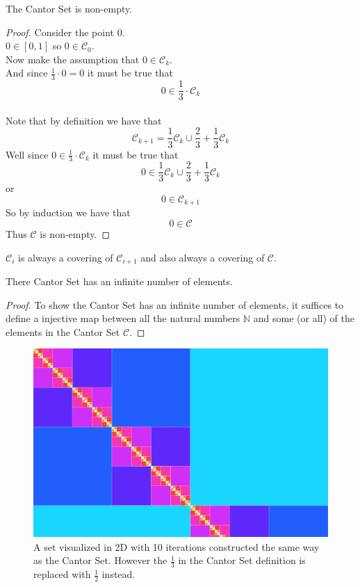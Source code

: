 \documentclass[11pt]{ekblite}
\begin{document}
	\begin{corollary}
		The Cantor Set is non-empty.
	\end{corollary}
	\begin{proof}Consider the point 0.
	\\[0.2in]$0 \in [0,1]$ so $0 \in \mathcal{C}_0$.
	\\[0.2in]Now make the assumption that $0 \in \mathcal{C}_k$.
	\\[0.2in]And since $\frac{1}{3} \cdot 0 = 0$ it must be true that
	\[0 \in \frac{1}{3} \cdot \mathcal{C}_k\] 
	\\[0.2in]Note that by definition we have that
	\[\mathcal{C}_{k+1} = \frac{1}{3} \mathcal{C}_{k} \cup \frac{2}{3} + \frac{1}{3} \mathcal{C}_{k}\]
	Well since $0 \in \frac{1}{3} \cdot \mathcal{C}_k$ it must be true that
	\[0 \in \frac{1}{3} \mathcal{C}_{k} \cup \frac{2}{3} + \frac{1}{3} \mathcal{C}_{k}\]
	or
	\[0 \in \mathcal{C}_{k+1}\]
	So by induction we have that
	\[0 \in \mathcal{C}\]
	Thus $\mathcal{C}$ is non-empty.
	\end{proof}
	\begin{corollary}
		$\mathcal{C}_{i}$ is always a covering of $\mathcal{C}_{i+1}$ and also always a covering of $\mathcal{C}$.
	\end{corollary}
	\begin{corollary}
		There Cantor Set has an infinite number of elements.
	\end{corollary}
	\begin{proof}
		To show the Cantor Set has an infinite number of elements, it suffices to define a injective map between all the natural numbers $\mathbb{N}$ and some (or all) of the elements in the Cantor Set $\mathcal{C}$.
	\end{proof}
	\newpage
	\begin{figure}[h]
		\includegraphics[scale=0.2]{img/c8.jpg}
		\caption{A set visualized in 2D with 10 iterations constructed the same way as the Cantor Set. However the $\frac{1}{3}$ in the Cantor Set definition is replaced with $\frac{1}{2}$ instead.}
	\end{figure}
\end{document}
